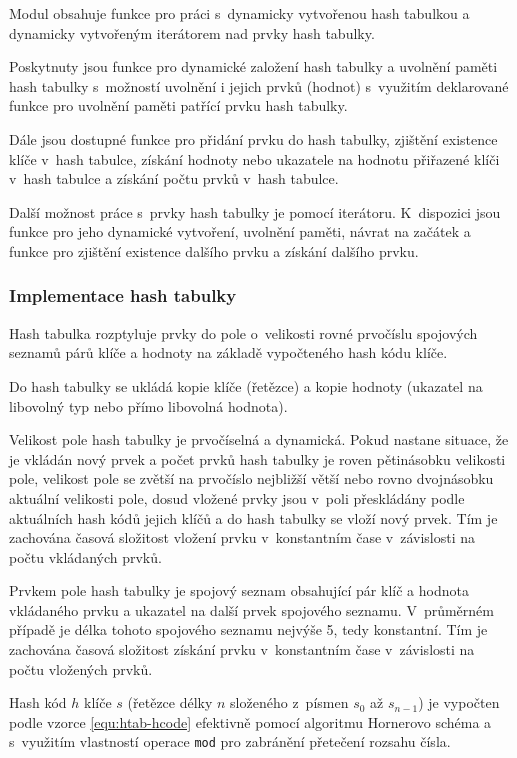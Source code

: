 \documentclass[a4paper, 12pt]{report}
\begin{document}
Modul obsahuje funkce pro práci s~dynamicky vytvořenou hash tabulkou a 
dynamicky vytvořeným iterátorem nad prvky hash tabulky.

Poskytnuty jsou funkce pro dynamické založení hash tabulky a uvolnění 
paměti hash tabulky s~možností uvolnění i jejich prvků (hodnot) s~využitím 
deklarované funkce pro uvolnění paměti patřící prvku hash tabulky.

Dále jsou dostupné funkce pro přidání prvku do hash tabulky, zjištění 
existence klíče v~hash tabulce, získání hodnoty nebo ukazatele na hodnotu 
přiřazené klíči v~hash tabulce a získání počtu prvků v~hash tabulce.

Další možnost práce s~prvky hash tabulky je pomocí iterátoru. K~dispozici 
jsou funkce pro jeho dynamické vytvoření, uvolnění paměti, návrat na 
začátek a funkce pro zjištění existence dalšího prvku a získání dalšího 
prvku.

\subsubsection{Implementace hash tabulky}

Hash tabulka rozptyluje prvky do pole o~velikosti rovné prvočíslu 
spojových seznamů párů klíče a hodnoty na základě vypočteného hash kódu 
klíče.

Do hash tabulky se ukládá kopie klíče (řetězce) a kopie hodnoty (ukazatel na libovolný typ nebo přímo libovolná hodnota).

Velikost pole hash tabulky je prvočíselná a dynamická. Pokud nastane 
situace, že je vkládán nový prvek a počet prvků hash tabulky je roven 
pětinásobku velikosti pole, velikost pole se zvětší na prvočíslo nejbližší 
větší nebo rovno dvojnásobku aktuální velikosti pole, dosud vložené prvky 
jsou v~poli přeskládány podle aktuálních hash kódů jejich klíčů a do hash 
tabulky se vloží nový prvek. Tím je zachována časová složitost vložení 
prvku v~konstantním čase v~závislosti na počtu vkládaných prvků.

Prvkem pole hash tabulky je spojový seznam obsahující pár klíč a hodnota 
vkládaného prvku a ukazatel na další prvek spojového seznamu. V~průměrném 
případě je délka tohoto spojového seznamu nejvýše 5, tedy konstantní. Tím 
je zachována časová složitost získání prvku v~konstantním čase
v~závislosti na počtu vložených prvků.

Hash kód $h$ klíče $s$ (řetězce délky $n$ složeného z~písmen $s_0$ až 
$s_{n-1}$) je vypočten podle vzorce \ref{equ:htab-hcode} efektivně pomocí 
algoritmu Hornerovo schéma a s~využitím vlastností operace \texttt{mod} 
pro zabránění přetečení rozsahu čísla.
\end{document}
